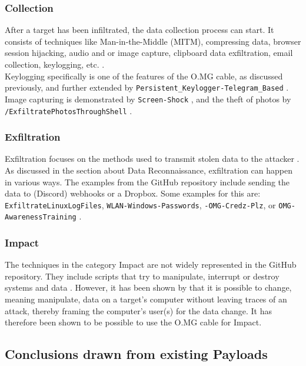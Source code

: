 \subsubsection{Collection}
After a target has been infiltrated, the data collection process can start. It consists of techniques like Man-in-the-Middle (MITM), compressing data, browser session hijacking, audio and or image capture, clipboard data exfiltration, email collection, keylogging, etc. \cite{MITREATTCK}. \\
Keylogging specifically is one of the features of the O.MG cable, as discussed previously, and further extended by \verb|Persistent_Keylogger-Telegram_Based|
\cite{OmgpayloadsPayloadsLibrary}. Image capturing is demonstrated by \verb|Screen-Shock| \cite{OmgpayloadsPayloadsLibrary}, and the theft of photos by \verb|/ExfiltratePhotosThroughShell| \cite{OmgpayloadsPayloadsLibrary}.


\subsubsection{Exfiltration}

Exfiltration focuses on the methods used to transmit stolen data to the attacker \cite{MITREATTCK}. As discussed in the section about Data Reconnaissance, exfiltration can happen in various ways. The examples from the GitHub repository include sending the data to (Discord) webhooks or a
Dropbox. Some examples for this are:  \verb|ExfiltrateLinuxLogFiles|, \verb|WLAN-Windows-Passwords|, \verb|-OMG-Credz-Plz|, or \verb|OMG-AwarenessTraining|  \cite{OmgpayloadsPayloadsLibrary}.

\subsubsection{Impact}

The techniques in the category Impact are not widely represented in the GitHub repository. They include scripts that try to manipulate, interrupt or destroy systems and data \cite{MITREATTCK}.
However, it has been shown by \cite{lawalFacilitatingCyberenabledFraud2022} that it is possible to change, meaning manipulate, data on a target's
computer without leaving traces of an attack, thereby framing the computer's user(s) for the data change. It has therefore been shown to be possible to use the O.MG cable for Impact.

\subsection{Conclusions drawn from existing Payloads}

